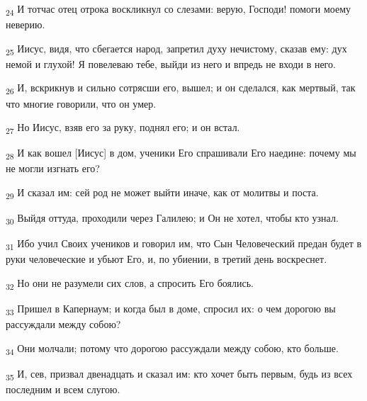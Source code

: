 \begin{tcolorbox}
\textsubscript{24} И тотчас отец отрока воскликнул со слезами: верую, Господи! помоги моему неверию.
\end{tcolorbox}
\begin{tcolorbox}
\textsubscript{25} Иисус, видя, что сбегается народ, запретил духу нечистому, сказав ему: дух немой и глухой! Я повелеваю тебе, выйди из него и впредь не входи в него.
\end{tcolorbox}
\begin{tcolorbox}
\textsubscript{26} И, вскрикнув и сильно сотрясши его, вышел; и он сделался, как мертвый, так что многие говорили, что он умер.
\end{tcolorbox}
\begin{tcolorbox}
\textsubscript{27} Но Иисус, взяв его за руку, поднял его; и он встал.
\end{tcolorbox}
\begin{tcolorbox}
\textsubscript{28} И как вошел [Иисус] в дом, ученики Его спрашивали Его наедине: почему мы не могли изгнать его?
\end{tcolorbox}
\begin{tcolorbox}
\textsubscript{29} И сказал им: сей род не может выйти иначе, как от молитвы и поста.
\end{tcolorbox}
\begin{tcolorbox}
\textsubscript{30} Выйдя оттуда, проходили через Галилею; и Он не хотел, чтобы кто узнал.
\end{tcolorbox}
\begin{tcolorbox}
\textsubscript{31} Ибо учил Своих учеников и говорил им, что Сын Человеческий предан будет в руки человеческие и убьют Его, и, по убиении, в третий день воскреснет.
\end{tcolorbox}
\begin{tcolorbox}
\textsubscript{32} Но они не разумели сих слов, а спросить Его боялись.
\end{tcolorbox}
\begin{tcolorbox}
\textsubscript{33} Пришел в Капернаум; и когда был в доме, спросил их: о чем дорогою вы рассуждали между собою?
\end{tcolorbox}
\begin{tcolorbox}
\textsubscript{34} Они молчали; потому что дорогою рассуждали между собою, кто больше.
\end{tcolorbox}
\begin{tcolorbox}
\textsubscript{35} И, сев, призвал двенадцать и сказал им: кто хочет быть первым, будь из всех последним и всем слугою.
\end{tcolorbox}
